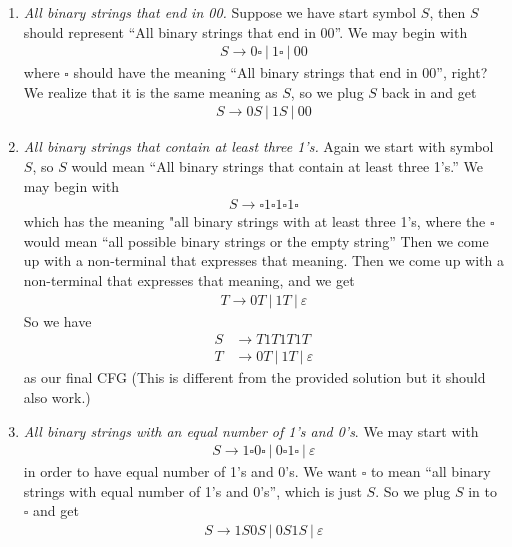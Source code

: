 \documentclass[10pt]{article}
\newcommand{\mapto}{\rightarrow}
\renewcommand{\ll}{\ |\ }
\begin{document}
\begin{enumerate}[label=(\alph*)]
\item \emph{All binary strings that end in 00.}
  Suppose we have start symbol $S$, then $S$ should represent ``All binary strings that end in 00''. We may begin with 
  \begin{align*}
    S \mapto 0 \square \ll 1 \square \ll 00
  \end{align*}
  where $\square$ should have the meaning ``All binary strings that end in 00'', right? We realize that it is the same meaning as $S$, so we plug $S$ back in and get
  \begin{align*}
    S \mapto 0 S \ll 1 S \ll 00
  \end{align*}

\item \emph{All binary strings that contain at least three 1's.} Again we start with symbol $S$, so $S$ would mean ``All binary strings that contain at least three 1's.'' We may begin with
  \begin{align*}
    S \mapto \square 1 \square 1 \square 1 \square
  \end{align*}
which has the meaning "all binary strings with at least three 1's, where the $\square$ would mean ``all possible binary strings or the empty string''
Then we come up with a non-terminal that expresses that meaning. Then we come up with a non-terminal that expresses that meaning, and we get
\begin{align*}
  T \mapto 0T \ll 1T \ll \varepsilon
\end{align*}
So we have
\begin{align*}
  S &\mapto T1T1T1T\\
  T &\mapto 0T \ll 1T \ll \varepsilon
\end{align*}
as our final CFG (This is different from the provided solution but it should also work.)

\item \emph{All binary strings with an equal number of 1's and 0's}.
  We may start with
  \begin{align*}
    S \mapto 1\square 0\square \ll 0\square 1\square \ll \varepsilon
  \end{align*}
  in order to have equal number of 1's and 0's. We want $\square$ to mean ``all binary strings with equal number of 1's and 0's'', which is just $S$. So we plug $S$ in to $\square$ and get
  \begin{align*}
    S \mapto 1S0S \ll 0S1S \ll \varepsilon
  \end{align*}
\end{enumerate}
\end{document}
